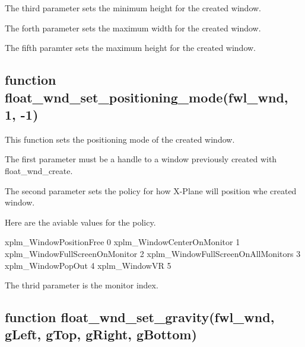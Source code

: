 \documentclass[11pt,parskip=half,a4paper]{scrartcl}
\begin{document}
The third parameter sets the  minimum height for the created window.

The forth parameter sets the maximum width for the created window.

The fifth paramter sets the maximum height for the created window.

\subsection{\hspace*{1.0mm}function float\_wnd\_set\_positioning\_mode(fwl\_wnd, 1, -1)}

This function sets the positioning mode of the created window.

The first parameter must be a handle to a window previously created with float\_wnd\_create.

The second parameter sets the policy for how X-Plane will position whe created window.

\hspace*{10mm}	Here are the aviable values for the policy.

\hspace*{10mm}	xplm\_WindowPositionFree \hspace*{23.0mm}	0\newline
\hspace*{10mm}	xplm\_WindowCenterOnMonitor \hspace*{15.0mm}	1\newline
\hspace*{10mm}	xplm\_WindowFullScreenOnMonitor \hspace*{8.5mm}	2\newline
\hspace*{10mm}	xplm\_WindowFullScreenOnAllMonitors \hspace*{2.5mm}	3\newline
\hspace*{10mm}	xplm\_WindowPopOut \hspace*{31.2mm}	4\newline
\hspace*{10mm}	xplm\_WindowVR \hspace*{38.0mm}	5

The thrid parameter is the monitor index.

\subsection{\hspace*{1.0mm}function float\_wnd\_set\_gravity(fwl\_wnd, gLeft, gTop, gRight, gBottom)}
\end{document}
